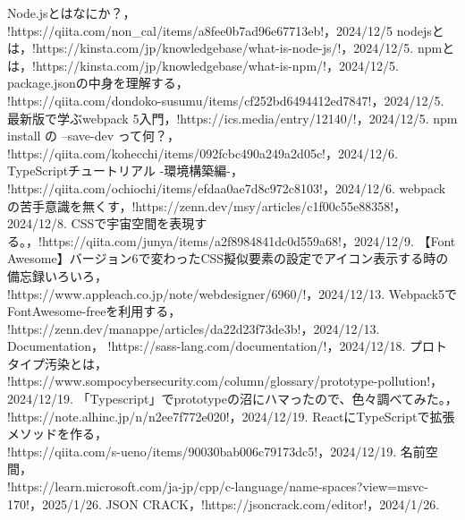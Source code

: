 \documentclass[autodetect-engine,dvi=dvipdfmx,ja=standard,
               a4j,11pt]{bxjsarticle}
\begin{document}
\begin{thebibliography}{99}
    Node.jsとはなにか？， \spverb!https://qiita.com/non_cal/items/a8fee0b7ad96e67713eb!，2024/12/5
    nodejsとは，\spverb!https://kinsta.com/jp/knowledgebase/what-is-node-js/!，2024/12/5.
    npmとは，\spverb!https://kinsta.com/jp/knowledgebase/what-is-npm/!，2024/12/5.
    package.jsonの中身を理解する，\\ \spverb!https://qiita.com/dondoko-susumu/items/cf252bd6494412ed7847!，2024/12/5.
    最新版で学ぶwebpack 5入門，\spverb!https://ics.media/entry/12140/!，2024/12/5.
    npm install の --save-dev って何？，\\ \spverb!https://qiita.com/kohecchi/items/092fcbc490a249a2d05c!，2024/12/6.
    TypeScriptチュートリアル -環境構築編-，\\ \spverb!https://qiita.com/ochiochi/items/efdaa0ae7d8c972c8103!，2024/12/6.
    webpackの苦手意識を無くす，\spverb!https://zenn.dev/msy/articles/c1f00c55e88358!，2024/12/8.
   CSSで宇宙空間を表現する。，\spverb!https://qiita.com/junya/items/a2f8984841dc0d559a68!，2024/12/9.
   【Font Awesome】バージョン6で変わったCSS擬似要素の設定でアイコン表示する時の備忘録いろいろ，\\ \spverb!https://www.appleach.co.jp/note/webdesigner/6960/!，2024/12/13.
   Webpack5でFontAwesome-freeを利用する，\\ \spverb!https://zenn.dev/manappe/articles/da22d23f73de3b!，2024/12/13.
   Documentation， \spverb!https://sass-lang.com/documentation/!，2024/12/18.
   プロトタイプ汚染とは，\\ \spverb!https://www.sompocybersecurity.com/column/glossary/prototype-pollution!，2024/12/19.
   「Typescript」でprototypeの沼にハマったので、色々調べてみた。，\\ \spverb!https://note.alhinc.jp/n/n2ee7f772e020!，2024/12/19.
   ReactにTypeScriptで拡張メソッドを作る，\\ \spverb!https://qiita.com/s-ueno/items/90030bab006c79173dc5!，2024/12/19.
   名前空間，\\ \spverb!https://learn.microsoft.com/ja-jp/cpp/c-language/name-spaces?view=msvc-170!，2025/1/26.
   JSON CRACK，\spverb!https://jsoncrack.com/editor!，2024/1/26.

\end{thebibliography}
\end{document}
